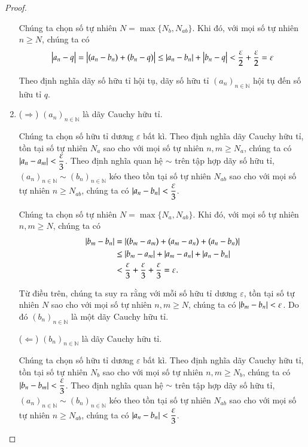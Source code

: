 \begin{proof}
\begin{enumerate}[label={(\roman*)},itemsep=0pt]
              Chúng ta chọn số tự nhiên $N = \max\{ N_{b}, N_{ab} \}$. Khi đó, với mọi số tự nhiên $n\geq N$, chúng ta có
              \[
                  \left\vert{a_{n} - q}\right\vert = \left\vert{(a_{n} - b_{n}) + (b_{n} - q)}\right\vert \leq \left\vert{a_{n} - b_{n}}\right\vert + \left\vert{b_{n} - q}\right\vert < \frac{\varepsilon}{2} + \frac{\varepsilon}{2} = \varepsilon
              \]

              Theo định nghĩa dãy số hữu tỉ hội tụ, dãy số hữu tỉ ${(a_{n})}_{n\in\mathbb{N}}$ hội tụ đến số hữu tỉ $q$.
        \item ($\Rightarrow$) ${(a_{n})}_{n\in\mathbb{N}}$ là dãy Cauchy hữu tỉ.

              Chúng ta chọn số hữu tỉ dương $\varepsilon$ bất kì. Theo định nghĩa dãy Cauchy hữu tỉ, tồn tại số tự nhiên $N_{a}$ sao cho với mọi số tự nhiên $n, m\geq N_{a}$, chúng ta có $\left\vert{a_{n} - a_{m}}\right\vert < \dfrac{\varepsilon}{3}$. Theo định nghĩa quan hệ $\sim$ trên tập hợp dãy số hữu tỉ, ${(a_{n})}_{n\in\mathbb{N}}\sim {(b_{n})}_{n\in\mathbb{N}}$ kéo theo tồn tại số tự nhiên $N_{ab}$ sao cho với mọi số tự nhiên $n \geq N_{ab}$, chúng ta có $\left\vert{a_{n} - b_{n}}\right\vert < \dfrac{\varepsilon}{3}$.

              Chúng ta chọn số tự nhiên $N = \max\{ N_{a}, N_{ab} \}$. Khi đó, với mọi số tự nhiên $n, m\geq N$, chúng ta có
              \begin{align*}
                  \left\vert{b_{m} - b_{n}}\right\vert & = \left\vert{(b_{m} - a_{m}) + (a_{m} - a_{n}) + (a_{n} - b_{n})}\right\vert                            \\
                                      & \leq \left\vert{b_{m} - a_{m}}\right\vert + \left\vert{a_{m} - a_{n}}\right\vert + \left\vert{a_{n} - b_{n}}\right\vert                   \\
                                      & < \frac{\varepsilon}{3} + \frac{\varepsilon}{3} + \frac{\varepsilon}{3} = \varepsilon.
              \end{align*}

              Từ điều trên, chúng ta suy ra rằng với mỗi số hữu tỉ dương $\varepsilon$, tồn tại số tự nhiên $N$ sao cho với mọi số tự nhiên $n, m\geq N$, chúng ta có $\left\vert{b_{m} - b_{n}}\right\vert < \varepsilon$. Do đó ${(b_{n})}_{n\in\mathbb{N}}$ là một dãy Cauchy hữu tỉ.

              ($\Leftarrow$) ${(b_{n})}_{n\in\mathbb{N}}$ là dãy Cauchy hữu tỉ.

              Chúng ta chọn số hữu tỉ dương $\varepsilon$ bất kì. Theo định nghĩa dãy Cauchy hữu tỉ, tồn tại số tự nhiên $N_{b}$ sao cho với mọi số tự nhiên $n, m\geq N_{b}$, chúng ta có $\left\vert{b_{n} - b_{m}}\right\vert < \dfrac{\varepsilon}{3}$. Theo định nghĩa quan hệ $\sim$ trên tập hợp dãy số hữu tỉ, ${(a_{n})}_{n\in\mathbb{N}}\sim {(b_{n})}_{n\in\mathbb{N}}$ kéo theo tồn tại số tự nhiên $N_{ab}$ sao cho với mọi số tự nhiên $n \geq N_{ab}$, chúng ta có $\left\vert{a_{n} - b_{n}}\right\vert < \dfrac{\varepsilon}{3}$.


\end{enumerate}
\end{proof}
